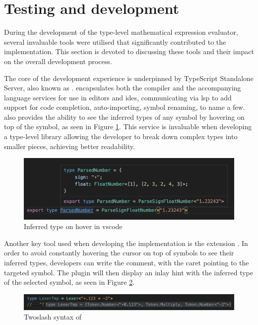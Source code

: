 \section{Testing and development}

During the development of the type-level mathematical expression evaluator, several invaluable tools were utilised that significantly contributed to the implementation. This section is devoted to discussing these tools and their impact on the overall development process.

The core of the development experience is underpinned by TypeScript Standalone Server, also known as .  encapsulates both the compiler and the accompanying language services for use in editors and \acrshort{ide}s, communicating via \acrshort{lsp} to add support for code completion, auto-importing, symbol renaming, to name a few.  also provides the ability to see the inferred types of any symbol by hovering on top of the symbol, as seen in Figure \ref{fig:tsserver-hover}. This service is invaluable when developing a type-level library allowing the developer to break down complex types into smaller pieces, achieving better readability.

\begin{figure}[ht]
  \centering
  \includegraphics[width=\textwidth]{text/testing/tsserver-hover.png}
  \caption{Inferred type on hover in \acrshort{vscode}}
  \label{fig:tsserver-hover}
\end{figure}

Another key tool used when developing the implementation is the  extension \cite{theroxVscodetwoslashqueries2023}. In order to avoid constantly hovering the cursor on top of symbols to see their inferred types, developers can write the  comment, with the caret pointing to the targeted symbol. The plugin will then display an inlay hint with the inferred type of the selected symbol, as seen in Figure \ref{fig:twoslash-plugin}.

\clearpage

\begin{figure}[ht]
  \centering
  \includegraphics[width=\textwidth]{text/testing/vscode-twoslash-plugin.png}
  \caption{Twoslash syntax of }
  \label{fig:twoslash-plugin}
\end{figure}

